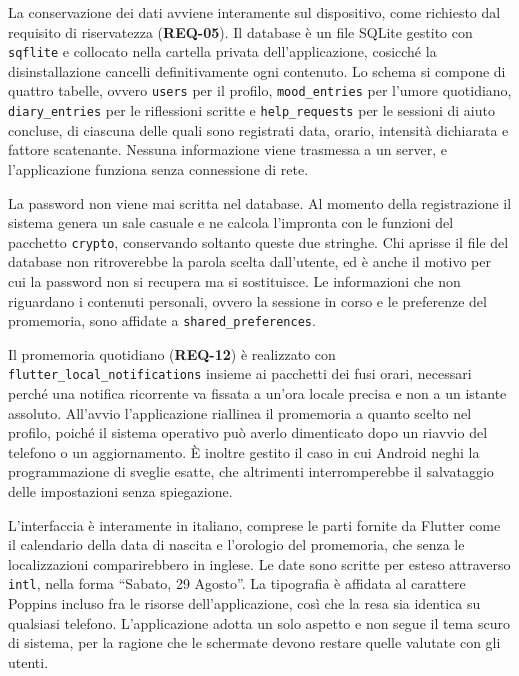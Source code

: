 La conservazione dei dati avviene interamente sul dispositivo, come richiesto dal requisito di riservatezza (\textbf{REQ-05}).
Il database è un file SQLite gestito con \texttt{sqflite} e collocato nella cartella privata dell'applicazione, cosicché la disinstallazione cancelli definitivamente ogni contenuto.
Lo schema si compone di quattro tabelle, ovvero \texttt{users} per il profilo, \texttt{mood\_entries} per l'umore quotidiano, \texttt{diary\_entries} per le riflessioni scritte e \texttt{help\_requests} per le sessioni di aiuto concluse, di ciascuna delle quali sono registrati data, orario, intensità dichiarata e fattore scatenante.
Nessuna informazione viene trasmessa a un server, e l'applicazione funziona senza connessione di rete.

La password non viene mai scritta nel database.
Al momento della registrazione il sistema genera un sale casuale e ne calcola l'impronta con le funzioni del pacchetto \texttt{crypto}, conservando soltanto queste due stringhe.
Chi aprisse il file del database non ritroverebbe la parola scelta dall'utente, ed è anche il motivo per cui la password non si recupera ma si sostituisce.
Le informazioni che non riguardano i contenuti personali, ovvero la sessione in corso e le preferenze del promemoria, sono affidate a \texttt{shared\_preferences}.

Il promemoria quotidiano (\textbf{REQ-12}) è realizzato con \texttt{flutter\_local\_notifications} insieme ai pacchetti dei fusi orari, necessari perché una notifica ricorrente va fissata a un'ora locale precisa e non a un istante assoluto.
All'avvio l'applicazione riallinea il promemoria a quanto scelto nel profilo, poiché il sistema operativo può averlo dimenticato dopo un riavvio del telefono o un aggiornamento.
È inoltre gestito il caso in cui Android neghi la programmazione di sveglie esatte, che altrimenti interromperebbe il salvataggio delle impostazioni senza spiegazione.

L'interfaccia è interamente in italiano, comprese le parti fornite da Flutter come il calendario della data di nascita e l'orologio del promemoria, che senza le localizzazioni comparirebbero in inglese.
Le date sono scritte per esteso attraverso \texttt{intl}, nella forma \enquote{Sabato, 29 Agosto}.
La tipografia è affidata al carattere Poppins incluso fra le risorse dell'applicazione, così che la resa sia identica su qualsiasi telefono.
L'applicazione adotta un solo aspetto e non segue il tema scuro di sistema, per la ragione che le schermate devono restare quelle valutate con gli utenti.

